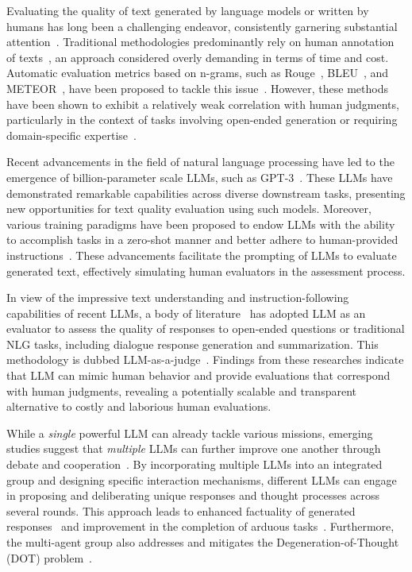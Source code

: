
Evaluating the quality of text generated by language models or written by humans has long been a challenging endeavor, consistently garnering substantial attention~\citep{celikyilmazEvaluationText2021a}. Traditional methodologies predominantly rely on human annotation of texts~\citep{callison2009fast}, an approach considered overly demanding in terms of time and cost. Automatic evaluation metrics based on n-grams, such as Rouge~\citep{lin2004rouge}, BLEU~\citep{papineni2002bleu}, and METEOR~\citep{banerjee2005meteor}, have been proposed to tackle this issue~\citep{kondrak2005n}. However, these methods have been shown to exhibit a relatively weak correlation with human judgments, particularly in the context of tasks involving open-ended generation or requiring domain-specific expertise~\citep{novikova-etal-2017-need}.

Recent advancements in the field of natural language processing have led to the emergence of billion-parameter scale LLMs, such as GPT-3~\citep{brown2020language}. These LLMs have demonstrated remarkable capabilities across diverse downstream tasks, presenting new opportunities for text quality evaluation using such models. Moreover, various training paradigms have been proposed to endow LLMs with the ability to accomplish tasks in a zero-shot manner and better adhere to human-provided instructions~\citep{ouyang2022training, sanh2021multitask, wei2021finetuned}. These advancements facilitate the prompting of LLMs to evaluate generated text, effectively simulating human evaluators in the assessment process.


In view of the impressive text understanding and instruction-following capabilities of recent LLMs, a body of literature~\citep{liu2023gpteval, chiang2023can, gao2023human, shen2023large} has adopted LLM as an evaluator to assess the quality of responses to open-ended questions or traditional NLG tasks, including dialogue response generation and summarization. This methodology is dubbed LLM-as-a-judge~\citep{zheng2023judging}. Findings from these researches indicate that LLM can mimic human behavior and provide evaluations that correspond with human judgments, revealing a potentially scalable and transparent alternative to costly and laborious human evaluations.

While a \textit{single} powerful LLM can already tackle various missions, emerging studies suggest that \textit{multiple} LLMs can further improve one another through debate and cooperation~\citep{li2023camel, liang2023encouraging}. By incorporating multiple LLMs into an integrated group and designing specific interaction mechanisms, different LLMs can engage in proposing and deliberating unique responses and thought processes across several rounds. This approach leads to enhanced factuality of generated responses~\citep{du2023improving} and improvement in the completion of arduous tasks~\citep{li2023camel, qian2023communicative}. Furthermore, the multi-agent group also addresses and mitigates the Degeneration-of-Thought (DOT) problem~\citep{liang2023encouraging}.


